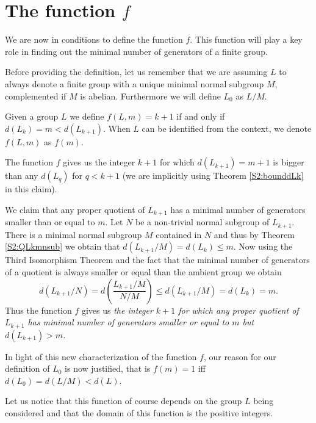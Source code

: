 \section{The function \texorpdfstring{$f$}{f}}

We are now in conditions to define the function $f$. This function will play a key role in finding out the minimal number of generators of a finite group.

Before providing the definition, let us remember that we are assuming $L$ to always denote a finite group with a unique minimal normal subgroup $M$, complemented if $M$ is abelian. Furthermore we will define $L_0$ as $L/M$.

\begin{definition}
    Given a group $L$ we define $f(L, m) = k+1$ if and only if $d(L_k) = m < d(L_{k+1})$. When $L$ can be identified from the context, we denote $f(L,m)$ as $f(m)$.
\end{definition}

The function $f$ gives us the integer $k+1$ for which $d(L_{k+1}) = m + 1$ is bigger than any $d(L_q)$ for $q < k+1$ (we are implicitly using Theorem \ref{S2:bounddLk} in this claim). 

We claim that any proper quotient of $L_{k+1}$ has a minimal number of generators smaller than or equal to $m$. 
Let $N$ be a non-trivial normal subgroup of $L_{k+1}$. 
There is a minimal normal subgroup $M$ contained in $N$ and  thus by Theorem \ref{S2:QLkmnsub} we obtain that $d(L_{k+1} / M) = d(L_k) \le m$. 
Now using the Third Isomorphism Theorem and the fact that the minimal number of generators of a quotient is always smaller or equal than the ambient group we obtain
$$
d(L_{k+1}/N) = d(\frac{L_{k+1}/M}{N/M}) \le d(L_{k+1} / M) = d(L_k) = m.
$$
Thus the function $f$ gives us \textit{the integer $k+1$ for which any proper quotient of $L_{k+1}$ has minimal number of generators smaller or equal to $m$ but $d(L_{k+1}) > m$.}

In light of this new characterization of the function $f$, our reason for our definition of $L_0$ is now justified, that is $f(m) = 1$ iff $d(L_0) = d(L/M) < d(L)$. 

Let us notice that this function of course depends on the group $L$ being considered and that the domain of this function is the positive integers. 

